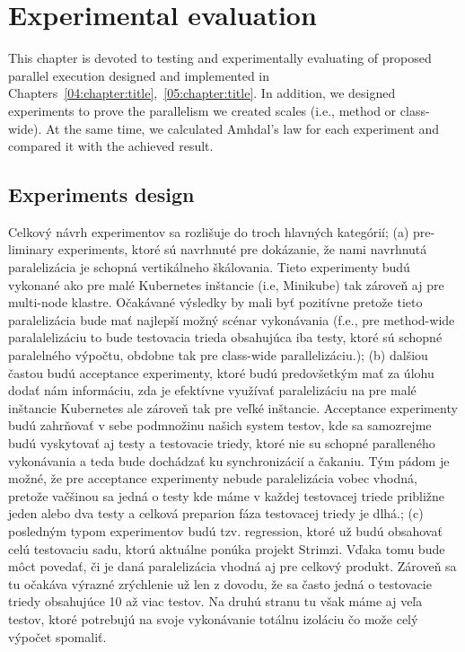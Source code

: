 \chapter{Experimental evaluation}
\label{06:chapter:title}

This chapter is devoted to testing and experimentally evaluating of proposed parallel execution designed and implemented in
Chapters~\ref{04:chapter:title},~\ref{05:chapter:title}.
In addition, we designed experiments to prove the parallelism we created scales (i.e., method or class-wide).
At the same time, we calculated Amhdal's law for each experiment and compared it with the achieved result.

\section{Experiments design}

Celkový návrh experimentov sa rozlišuje do troch hlavných kategórií; (a) pre-liminary experiments, ktoré sú navrhnuté
pre dokázanie, že nami navrhnutá paralelizácia je schopná vertikálneho škálovania. Tieto experimenty budú vykonané
ako pre malé Kubernetes inštancie (i.e, Minikube) tak zároveň aj pre multi-node klastre.
Očakávané výsledky by mali byť pozitívne pretože tieto paralelizácia bude mať najlepší možný scénar vykonávania (f.e., pre method-wide paralalelizáciu
to bude testovacia trieda obsahujúca iba testy, ktoré sú schopné paralelného výpočtu, obdobne tak pre class-wide parallelizáciu.);
(b) dalšiou častou budú acceptance experimenty, ktoré budú predovšetkým mať za úlohu dodať nám informáciu, zda je efektívne
využívať paralelizáciu na pre malé inštancie Kubernetes ale zároveň tak pre veľké inštancie. Acceptance experimenty
budú zahrňovať v sebe podmnožinu našich system testov, kde sa samozrejme budú vyskytovať aj testy a testovacie triedy,
ktoré nie su schopné paralleného vykonávania a teda bude dochádzať ku synchronizácií a čakaniu. Tým pádom je možné, že
pre acceptance experimenty nebude paralelizácia vobec vhodná, pretože vačšinou sa jedná o testy kde máme v každej
testovacej triede približne jeden alebo dva testy a celková preparion fáza testovacej triedy je dlhá.; (c) posledným
typom experimentov budú tzv. regression, ktoré už budú obsahovať celú testovaciu sadu, ktorú aktuálne ponúka projekt Strimzi.
Vďaka tomu bude môct povedať, či je daná paralelizácia vhodná aj pre celkový produkt. Zároveň sa tu očakáva výrazné zrýchlenie
už len z dovodu, že sa často jedná o testovacie triedy obsahujúce 10 až viac testov. Na druhú stranu tu však máme aj veľa
testov, ktoré potrebujú na svoje vykonávanie totálnu izoláciu čo može celý výpočet spomaliť.

